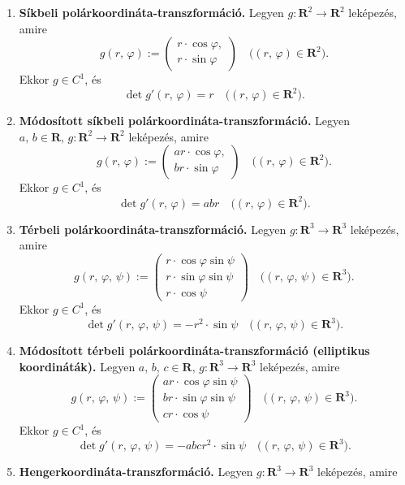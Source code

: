 \documentclass{article}
\newcommand{\R}{\mathbf{R}}
\begin{document}
	\begin{enumerate}
		\item \textbf{Síkbeli polárkoordináta-transzformáció.} Legyen $g : \R^2 \to \R^2$ leképezés, amire
		\[
			g(r, \, \varphi) := \begin{pmatrix}
				r \cdot \cos \varphi, \\
				r \cdot \sin \varphi
			\end{pmatrix} \quad \big( (r, \, \varphi) \in \R^2 \big).
		\]
		Ekkor $g \in C^1$, és
		\[
			\det g'(r, \, \varphi) = r \quad \big( (r, \, \varphi) \in \R^2 \big).
		\]
		\item \textbf{Módosított síkbeli polárkoordináta-transzformáció.} Legyen $a, \, b \in \R, \, g : \R^2 \to \R^2$ leképezés, amire
		\[
			g(r, \, \varphi) := \begin{pmatrix}
				ar \cdot \cos \varphi, \\
				br \cdot \sin \varphi
			\end{pmatrix} \quad \big( (r, \, \varphi) \in \R^2 \big).
		\]
		Ekkor $g \in C^1$, és
		\[
			\det g'(r, \, \varphi) = abr \quad \big( (r, \, \varphi) \in \R^2 \big).
		\]
		\item \textbf{Térbeli polárkoordináta-transzformáció.} Legyen $g : \R^3 \to \R^3$ leképezés, amire
		\[
			g(r, \, \varphi, \, \psi) := \begin{pmatrix}
				r \cdot \cos \varphi \sin \psi \\
				r \cdot \sin \varphi \sin \psi \\
				r \cdot \cos \psi
			\end{pmatrix} \quad \big( (r, \, \varphi, \, \psi) \in \R^3\big).
		\]
		Ekkor $g \in C^1$, és
		\[
			\det g'(r, \, \varphi, \, \psi) = -r^2 \cdot \sin \psi \quad \big( (r, \, \varphi, \, \psi) \in \R^3\big).
		\]
		\item \textbf{Módosított térbeli polárkoordináta-transzformáció (elliptikus koordináták).} Legyen $a, \, b, \, c \in \R, \, g : \R^3 \to \R^3$ leképezés, amire
		\[
			g(r, \, \varphi, \, \psi) := \begin{pmatrix}
				ar \cdot \cos \varphi \sin \psi \\
				br \cdot \sin \varphi \sin \psi \\
				cr \cdot \cos \psi
			\end{pmatrix} \quad \big( (r, \, \varphi, \, \psi) \in \R^3\big).
		\]
		Ekkor $g \in C^1$, és
		\[
			\det g'(r, \, \varphi, \, \psi) = -abcr^2 \cdot \sin \psi \quad \big( (r, \, \varphi, \, \psi) \in \R^3\big).
		\]
		\item \textbf{Hengerkoordináta-transzformáció.} Legyen $g : \R^3 \to \R^3$ leképezés, amire

\end{enumerate}
\end{document}
